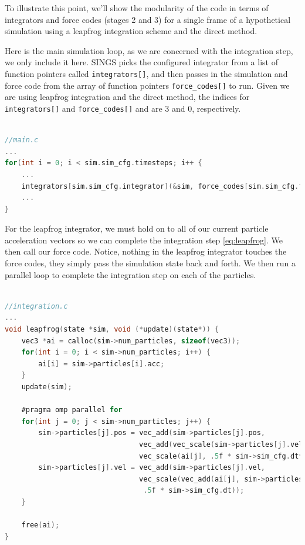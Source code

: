 \documentclass[12pt, twoside, letterpaper]{article}
\begin{document}
To illustrate this point, we'll show the modularity of the code in terms of integrators and force codes (stages 2 and 3) for a single frame of a hypothetical simulation using a leapfrog integration scheme and the direct method.

Here is the main simulation loop, as we are concerned with the integration step, we only include it here. SINGS picks the configured integrator from a list of function pointers called \verb+integrators[]+, and then passes in the simulation and force code from the array of function pointers \verb+force_codes[]+ to run. Given we are using leapfrog integration and the direct method, the indices for \verb+integrators[]+ and \verb+force_codes[]+ and are 3 and 0, respectively.



\scriptsize
\begin{minipage}{\linewidth}
\begin{lstlisting}[language=C, label={lst:main}, frame=single]

//main.c
...
for(int i = 0; i < sim.sim_cfg.timesteps; i++ {
	...
	integrators[sim.sim_cfg.integrator](&sim, force_codes[sim.sim_cfg.force_method]);
	...	
}
\end{lstlisting}
\end{minipage}

\normalsize
For the leapfrog integrator, we must hold on to all of our current particle acceleration vectors so we can complete the integration step \eqref{eq:leapfrog}. We then call our force code. Notice, nothing in the leapfrog integrator touches the force codes, they simply pass the simulation state back and forth. We then run a parallel loop to complete the integration step on each of the particles.
\vspace{0.3cm}

\scriptsize
\begin{minipage}{\linewidth}
\begin{lstlisting}[language=C, label={lst:integration}, frame=single]

//integration.c
...
void leapfrog(state *sim, void (*update)(state*)) {
    vec3 *ai = calloc(sim->num_particles, sizeof(vec3));
    for(int i = 0; i < sim->num_particles; i++) {
        ai[i] = sim->particles[i].acc;
    }
    update(sim);

    #pragma omp parallel for
    for(int j = 0; j < sim->num_particles; j++) {
        sim->particles[j].pos = vec_add(sim->particles[j].pos, 
                                vec_add(vec_scale(sim->particles[j].vel,sim->sim_cfg.dt), 
                                vec_scale(ai[j], .5f * sim->sim_cfg.dt*sim->sim_cfg.dt)));
        sim->particles[j].vel = vec_add(sim->particles[j].vel, 
                                vec_scale(vec_add(ai[j], sim->particles[j].acc),
                                 .5f * sim->sim_cfg.dt));
    }

    free(ai);
}
\end{lstlisting}
\end{minipage}
\end{document}
